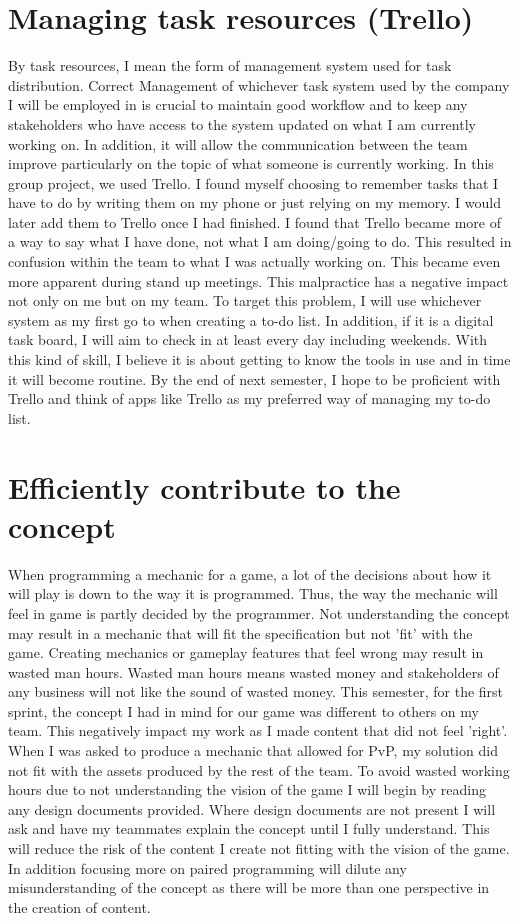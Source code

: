 \documentclass{scrartcl}
\begin{document}
\section{Managing task resources (Trello)}
By task resources, I mean the form of management system used for task distribution. Correct Management of whichever task system used by the company I will be employed in is crucial to maintain good workflow and to keep any stakeholders who have access to the system updated on what I am currently working on. In addition, it will allow the communication between the team improve particularly on the topic of what someone is currently working. In this group project, we used Trello. I found myself choosing to remember tasks that I have to do by writing them on my phone or just relying on my memory. I would later add them to Trello once I had finished. I found that Trello became more of a way to say what I have done, not what I am doing/going to do. This resulted in confusion within the team to what I was actually working on. This became even more apparent during stand up meetings. This malpractice has a negative impact not only on me but on my team. To target this problem, I will use whichever system as my first go to when creating a to-do list. In addition, if it is a digital task board, I will aim to check in at least every day including weekends. With this kind of skill, I believe it is about getting to know the tools in use and in time it will become routine. By the end of next semester, I hope to be proficient with Trello and think of apps like Trello as my preferred way of managing my to-do list.

\section{Efficiently contribute to the concept}
When programming a mechanic for a game, a lot of the decisions about how it will play is down to the way it is programmed. Thus, the way the mechanic will feel in game is partly decided by the programmer.  Not understanding the concept may result in a mechanic that will fit the specification but not 'fit' with the game. Creating mechanics or gameplay features that feel wrong may result in wasted man hours. Wasted man hours means wasted money and stakeholders of any business will not like the sound of wasted money. This semester, for the first sprint, the concept I had in mind for our game was different to others on my team. This negatively impact my work as I made content that did not feel 'right'. When I was asked to produce a mechanic that allowed for PvP, my solution did not fit with the assets produced by the rest of the team. To avoid wasted working hours due to not understanding the vision of the game I will begin by reading any design documents provided. Where design documents are not present I will ask and have my teammates explain the concept until I fully understand. This will reduce the risk of the content I create not fitting with the vision of the game. In addition focusing more on paired programming will dilute any misunderstanding of the concept as there will be more than one perspective in the creation of content.
\end{document}
